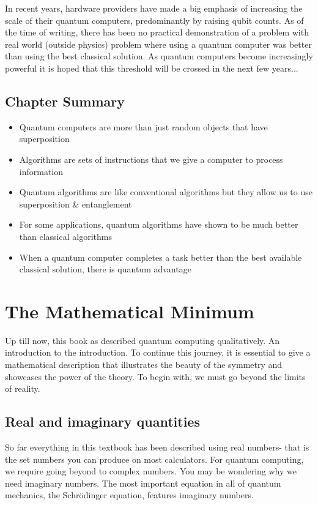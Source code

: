 \documentclass{book}
\begin{document}
In recent years, hardware providers have made a big emphasis of increasing the scale of their quantum computers, predominantly by raising qubit counts. As of the time of writing, there has been no practical demonstration of a problem with real world (outside physics) problem where using a quantum computer was better than using the best classical solution. As quantum computers become increasingly powerful it is hoped that this threshold will be crossed in the next few years...

\section{Chapter Summary}
\begin{itemize}
    \item Quantum computers are more than just random objects that have superposition
    \item Algorithms are sets of instructions that we give a computer to process information 
    \item Quantum algorithms are like conventional algorithms but they allow us to use superposition \& entanglement 
    \item For some applications, quantum algorithms have shown to be much better than classical algorithms
    \item When a quantum computer completes a task better than the best available classical solution, there is quantum advantage
\end{itemize}
\chapter{The Mathematical Minimum}

Up till now, this book as described quantum computing qualitatively. An introduction to the introduction. To continue this journey, it is essential to give a mathematical description that illustrates the beauty of the symmetry and showcases the power of the theory. To begin with, we must go beyond the limits of reality. 

\section{Real and imaginary quantities}

So far everything in this textbook has been described using real numbers- that is the set numbers you can produce on most calculators. For quantum computing, we require going beyond to complex numbers. You may be wondering why we need imaginary numbers. The most important equation in all of quantum mechanics, the Schrödinger equation, features imaginary numbers. 
\end{document}
